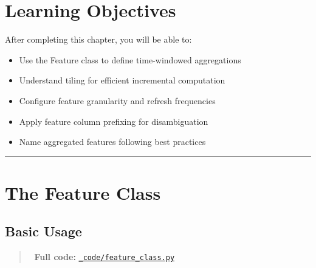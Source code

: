 \documentclass[
  letterpaper,
  DIV=11,
  numbers=noendperiod]{scrreprt}
\providecommand{\tightlist}{%
  \setlength{\itemsep}{0pt}\setlength{\parskip}{0pt}}\usepackage{longtable,booktabs,array}
\begin{document}
\hypertarget{learning-objectives-6}{%
\section{Learning Objectives}\label{learning-objectives-6}}

After completing this chapter, you will be able to:

\begin{itemize}
\tightlist
\item
  Use the Feature class to define time-windowed aggregations
\item
  Understand tiling for efficient incremental computation
\item
  Configure feature granularity and refresh frequencies
\item
  Apply feature column prefixing for disambiguation
\item
  Name aggregated features following best practices
\end{itemize}

\begin{center}\rule{0.5\linewidth}{0.5pt}\end{center}

\hypertarget{the-feature-class}{%
\section{The Feature Class}\label{the-feature-class}}

\hypertarget{basic-usage}{%
\subsection{Basic Usage}\label{basic-usage}}

\begin{quote}
📁 \textbf{Full code:}
\href{_code/feature_class.py}{\texttt{\_code/feature\_class.py}}
\end{quote}
\end{document}
